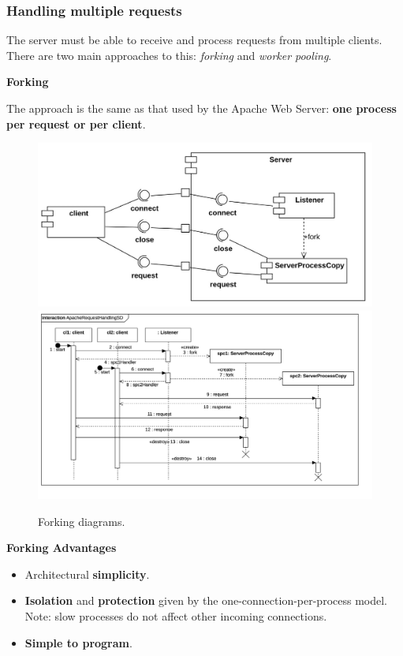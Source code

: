 \newpage

\subsubsection{Handling multiple requests}

The server must be able to receive and process requests from multiple clients. There are two main approaches to this: \emph{forking} and \emph{worker pooling}.

\begin{flushleft}
    \large
    \textcolor{Red2}{\textbf{Forking}}
\end{flushleft}
The  approach is the same as that used by the Apache Web Server: \textbf{one process per request or per client}.

\begin{figure}[!htp]
    \centering
    \includegraphics[width=.8\textwidth]{img/forking-1.png}
    \includegraphics[width=\textwidth]{img/forking-2.png}
    \caption{Forking diagrams.}
\end{figure}

\begin{flushleft}
    \textcolor{Green3}{\textbf{ Forking Advantages}}
\end{flushleft}
\begin{itemize}
    \item Architectural \textbf{simplicity}.
    
    \item \textbf{Isolation} and \textbf{protection} given by the one-connection-per-process model. Note: slow processes do not affect other incoming connections.
    
    \item \textbf{Simple to program}.
\end{itemize}

